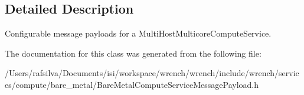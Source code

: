 \subsection{Detailed Description}
Configurable message payloads for a Multi\+Host\+Multicore\+Compute\+Service. 

The documentation for this class was generated from the following file\+:\begin{DoxyCompactItemize}
\item 
/\+Users/rafsilva/\+Documents/isi/workspace/wrench/wrench/include/wrench/services/compute/bare\+\_\+metal/Bare\+Metal\+Compute\+Service\+Message\+Payload.\+h\end{DoxyCompactItemize}
